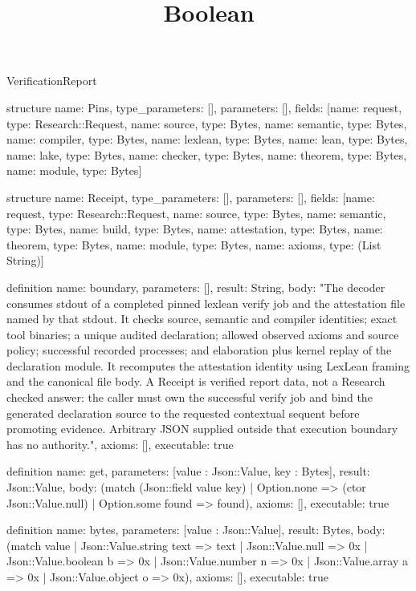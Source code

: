 \begin{lexlean}{VerificationReport}
\title{Boolean}
\begin{semanticmodule}

structure{
  name: Pins,
  type_parameters: [],
  parameters: [],
  fields: [{name: request, type: Research::Request}, {name: source, type: Bytes}, {name: semantic, type: Bytes}, {name: compiler, type: Bytes}, {name: lexlean, type: Bytes}, {name: lean, type: Bytes}, {name: lake, type: Bytes}, {name: checker, type: Bytes}, {name: theorem, type: Bytes}, {name: module, type: Bytes}]
}

structure{
  name: Receipt,
  type_parameters: [],
  parameters: [],
  fields: [{name: request, type: Research::Request}, {name: source, type: Bytes}, {name: semantic, type: Bytes}, {name: build, type: Bytes}, {name: attestation, type: Bytes}, {name: theorem, type: Bytes}, {name: module, type: Bytes}, {name: axioms, type: (List String)}]
}

definition{
  name: boundary,
  parameters: [],
  result: String,
  body: "The decoder consumes stdout of a completed pinned lexlean verify job and the attestation file named by that stdout. It checks source, semantic and compiler identities; exact tool binaries; a unique audited declaration; allowed observed axioms and source policy; successful recorded processes; and elaboration plus kernel replay of the declaration module. It recomputes the attestation identity using LexLean framing and the canonical file body. A Receipt is verified report data, not a Research checked answer: the caller must own the successful verify job and bind the generated declaration source to the requested contextual sequent before promoting evidence. Arbitrary JSON supplied outside that execution boundary has no authority.",
  axioms: [],
  executable: true
}

definition{
  name: get,
  parameters: [value : Json::Value, key : Bytes],
  result: Json::Value,
  body: (match (Json::field value key) | Option.none => (ctor Json::Value.null) | Option.some found => found),
  axioms: [],
  executable: true
}

definition{
  name: bytes,
  parameters: [value : Json::Value],
  result: Bytes,
  body: (match value | Json::Value.string text => text | Json::Value.null => 0x | Json::Value.boolean b => 0x | Json::Value.number n => 0x | Json::Value.array a => 0x | Json::Value.object o => 0x),
  axioms: [],
  executable: true
}


\end{semanticmodule}
\end{lexlean}
